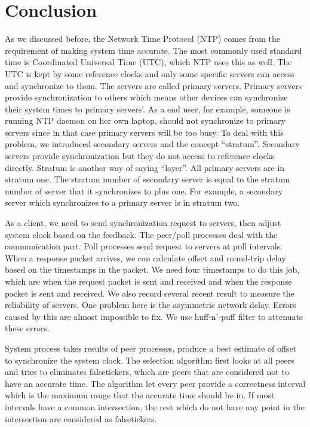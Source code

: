 
\chapter{Conclusion}
\label{cha:conclusion}

As we discussed before, the Network Time Protocol (NTP) comes from the
requirement of making system time accurate. The most commonly used standard
time is Coordinated Universal Time (UTC), which NTP uses this as well. The UTC
is kept by some reference clocks and only some specific servers can access and
synchronize to them. The servers are called primary servers. Primary servers
provide synchronization to others which means other devices can synchronize
their system times to primary servers'. As a end user, for example, someone is
running NTP daemon on her own laptop, should not synchronize to primary servers
since in that case primary servers will be too busy. To deal with this problem,
we introduced secondary servers and the concept ``stratum''. Secondary servers
provide synchronization but they do not access to reference clocks directly.
Stratum is another way of saying ``layer''. All primary servers are in stratum
one. The stratum number of secondary server is equal to the stratum number of
server that it synchronizes to plus one. For example, a secondary server which
synchronizes to a primary server is in stratum two. 

As a client, we need to send synchronization request to servers, then adjust
system clock based on the feedback. The peer/poll processes deal with the
communication part. Poll processes send request to servers at poll intervals.
When a response packet arrives, we can calculate offset and round-trip delay
based on the timestamps in the packet. We need four timestamps to do this job,
which are when the request packet is sent and received and when the response
packet is sent and received. We also record several recent result to measure
the reliability of servers. One problem here is the asymmetric network delay.
Errors caused by this are almost impossible to fix. We use huff-n'-puff
filter to attenuate these errors.

System process takes results of peer processes, produce a best estimate of
offset to synchronize the system clock. The selection algorithm first looks at
all peers and tries to eliminates falsetickers, which are peers that are
considered not to have an accurate time. The algorithm let every peer provide a
correctness interval which is the maximum range that the accurate time should
be in. If most intervals have a common intersection, the rest which do not have
any point in the intersection are considered as falsetickers. 

